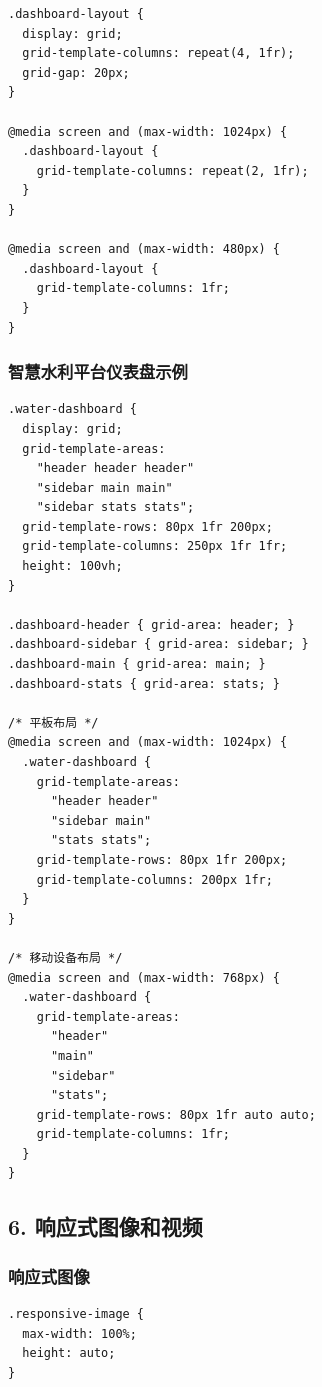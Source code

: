 \begin{lstlisting}
.dashboard-layout {
  display: grid;
  grid-template-columns: repeat(4, 1fr);
  grid-gap: 20px;
}

@media screen and (max-width: 1024px) {
  .dashboard-layout {
    grid-template-columns: repeat(2, 1fr);
  }
}

@media screen and (max-width: 480px) {
  .dashboard-layout {
    grid-template-columns: 1fr;
  }
}
\end{lstlisting}

\subsubsection{智慧水利平台仪表盘示例}\label{ux667aux6167ux6c34ux5229ux5e73ux53f0ux4eeaux8868ux76d8ux793aux4f8b}

\begin{lstlisting}
.water-dashboard {
  display: grid;
  grid-template-areas:
    "header header header"
    "sidebar main main"
    "sidebar stats stats";
  grid-template-rows: 80px 1fr 200px;
  grid-template-columns: 250px 1fr 1fr;
  height: 100vh;
}

.dashboard-header { grid-area: header; }
.dashboard-sidebar { grid-area: sidebar; }
.dashboard-main { grid-area: main; }
.dashboard-stats { grid-area: stats; }

/* 平板布局 */
@media screen and (max-width: 1024px) {
  .water-dashboard {
    grid-template-areas:
      "header header"
      "sidebar main"
      "stats stats";
    grid-template-rows: 80px 1fr 200px;
    grid-template-columns: 200px 1fr;
  }
}

/* 移动设备布局 */
@media screen and (max-width: 768px) {
  .water-dashboard {
    grid-template-areas:
      "header"
      "main"
      "sidebar"
      "stats";
    grid-template-rows: 80px 1fr auto auto;
    grid-template-columns: 1fr;
  }
}
\end{lstlisting}

\subsection{6.
响应式图像和视频}\label{ux54cdux5e94ux5f0fux56feux50cfux548cux89c6ux9891}

\subsubsection{响应式图像}\label{ux54cdux5e94ux5f0fux56feux50cf}

\begin{lstlisting}
.responsive-image {
  max-width: 100%;
  height: auto;
}
\end{lstlisting}

